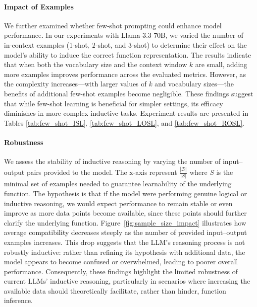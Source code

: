 


\paragraph{Impact of Examples} We further examined whether few-shot prompting could enhance model performance. In our experiments with Llama-3.3 70B, we varied the number of in-context examples (1-shot, 2-shot, and 3-shot) to determine their effect on the model's ability to induce the correct function representation. The results indicate that when both the vocabulary size and the context window $k$ are small, adding more examples improves performance across the evaluated metrics. However, as the complexity increases—with larger values of $k$ and vocabulary sizes—the benefits of additional few-shot examples become negligible. These findings suggest that while few-shot learning is beneficial for simpler settings, its efficacy diminishes in more complex inductive tasks. Experiment results are presented in Tables \ref{tab:few_shot_ISL}, \ref{tab:few_shot_LOSL}, and \ref{tab:few_shot_ROSL}.





\paragraph{Robustness} We assess the stability of inductive reasoning by varying the number of input–output pairs provided to the model. The x-axis represent $\frac{|\mathcal{D}|}{|S|}$ where $S$ is the minimal set of examples needed to guarantee learnability of the underlying function. The hypothesis is that if the model were performing genuine logical or inductive reasoning, we would expect performance to remain stable or even improve as more data points become available, since these points should further clarify the underlying function. Figure~\ref{fig:sample_size_impact} illustrates how average compatibility decreases steeply as the number of provided input–output examples increases. This drop suggests that the LLM's reasoning process is not robustly inductive: rather than refining its hypothesis with additional data, the model appears to become confused or overwhelmed, leading to poorer overall performance. Consequently, these findings highlight the limited robustness of current LLMs' inductive reasoning, particularly in scenarios where increasing the available data should theoretically facilitate, rather than hinder, function inference.

